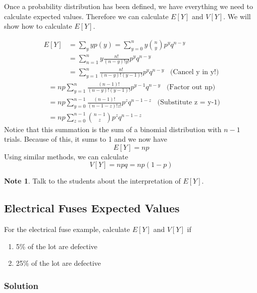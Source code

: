 \documentclass[11pt]{article}
\theoremstyle{definition}
\newtheorem{note}{Note}
\begin{document}
Once a probability distribution has been defined, we have everything we need to calculate expected values. Therefore we can calculate $E[Y]$ and $V[Y]$. We will show how to calculate $E[Y]$.

\begin{shaded}
	$$
		\begin{aligned}
			E[Y] & = \sum_y yp(y) = \sum_{y=0}^n y {n \choose y} p^y q^{n-y} \\
			& = \sum_{n=1}^n y \frac{n!}{(n-y)!y!} p^y q^{n-y} \\
			& = \sum_{y=1}^n \frac{n!}{(n-y)!(y-1)!} p^y q^{n-y} \;\;\; \text{(Cancel y in y!)}
		\end{aligned}
	$$
	$$
		\begin{aligned}
			& = np \sum_{y=1}^n \frac{(n-1)!}{(n-y)!(y-1)!} p^{y-1}q^{n-y} \;\;\; \text{(Factor out np)} \\
			& = np \sum_{y=0}^{n-1} \frac{(n-1)!}{(n-1-z)!z!} p^z q^{n-1-z} \;\;\; \text{(Substitute z = y-1)} \\
			& = np \sum_{z=0}^{n-1} {n-1 \choose z} p^z q^{n-1-z}
		\end{aligned}
	$$
	\newpage
	Notice that this summation is the sum of a binomial distribution with $n-1$ trials. Because of this, it sums to 1 and we now have
	$$
		E[Y] = np
	$$
	Using similar methods, we can calculate
	$$
		V[Y] = npq = np(1-p)
	$$
\end{shaded}

\begin{note}
	Talk to the students about the interpretation of $E[Y]$.
\end{note}

\subsection{Electrical Fuses Expected Values}

For the electrical fuse example, calculate $E[Y]$ and $V[Y]$ if

\begin{enumerate}[label=\alph*)]
	\item 5\% of the lot are defective
	\item 25\% of the lot are defective
\end{enumerate}

\subsubsection*{Solution}
\end{document}
